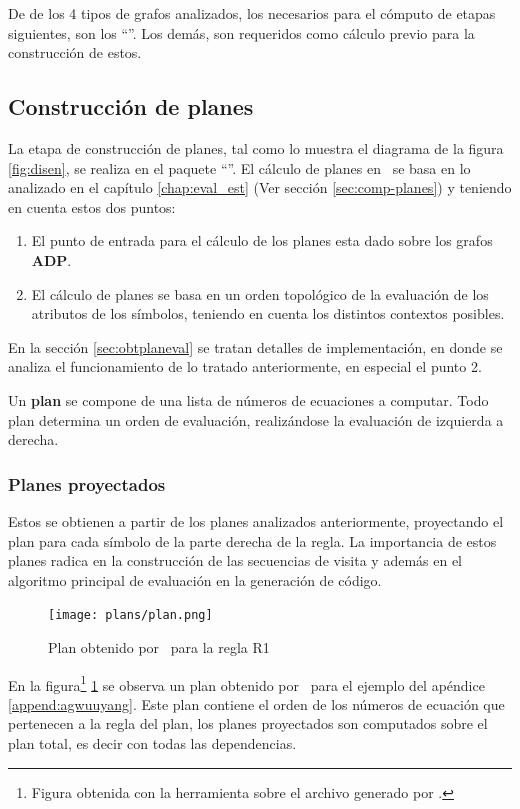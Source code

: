 De de los 4 tipos de grafos analizados, los necesarios para el cómputo de etapas siguientes, son los ``''. Los demás, son requeridos como cálculo previo para la construcción de estos.

\subsection{Construcción de planes}
\label{subsec:conts-plan-dise}
La etapa de construcción de planes, tal como lo muestra el diagrama de la figura \ref{fig:disen}, se realiza en el paquete ``''. El cálculo de planes en \maggen\ se basa en lo analizado en el capítulo \ref{chap:eval_est} (Ver sección \ref{sec:comp-planes}) y teniendo en cuenta estos dos puntos:

\begin{enumerate}
\item El punto de entrada para el cálculo de los planes esta dado sobre los grafos \textbf{ADP}. 
\item El cálculo de planes se basa en un orden topológico de la evaluación de los atributos de los símbolos, teniendo en cuenta los distintos contextos posibles.
\end{enumerate}

En la sección \ref{sec:obtplaneval} se tratan detalles de implementación, en donde se analiza el funcionamiento de lo tratado anteriormente, en especial el punto 2.

Un \textbf{plan} se compone de una lista de números de ecuaciones a computar. Todo plan determina un orden de evaluación, realizándose la evaluación de izquierda a derecha.

\subsubsection{Planes proyectados}

Estos se obtienen a partir de los planes analizados anteriormente, proyectando el plan para cada símbolo de la parte derecha de la regla. La importancia de estos planes radica en la construcción de las secuencias de visita y además en el algoritmo principal de evaluación en la generación de código.

\begin{figure}[!ht]\centering
 \texttt{[image: plans/plan.png]}
\caption{\label{fig:plan}Plan obtenido por \maggen\ para la regla R1}
\end{figure}

En la figura\footnote{Figura obtenida con la herramienta  sobre el archivo  generado por \maggen.} \ref{fig:plan} se observa un plan obtenido por \maggen\ para el ejemplo del apéndice \ref{append:agwuuyang}. Este plan contiene el orden de los números de ecuación que pertenecen a la regla del plan, los planes proyectados son computados sobre el plan total, es decir con todas las dependencias.

